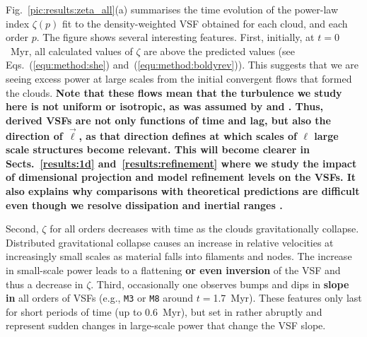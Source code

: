 Fig.~\ref{pic:results:zeta_all}(a) summarises the time evolution of the power-law index $\zeta(p)$ fit to the density-weighted VSF obtained for each cloud, and each order $p$.
The figure shows several interesting features.
First, initially, at $t=0$~Myr, all calculated values of $\zeta$ are above the predicted values (see Eqs.~(\ref{equ:method:she}) and~(\ref{equ:method:boldyrev})).
This suggests that we are seeing excess power at large scales from the initial convergent flows that formed the clouds.
\textbf{
Note that these flows mean that the turbulence we study here is not uniform or isotropic, as was assumed by \citet{She1994} and \citet{Boldyrev2002}.  Thus, derived VSFs are not only functions of time and lag, but also the direction of $\vec{\ell}$, as that direction defines at which scales of $\ell$ large scale structures become relevant.
This will become clearer in Sects.~\ref{results:1d} and~\ref{results:refinement} where we study the impact of dimensional projection and model refinement levels on the VSFs. 
It also explains why comparisons with theoretical predictions are difficult even though we resolve dissipation and inertial ranges .
}

Second, $\zeta$ for all orders decreases with time as the clouds gravitationally collapse.
Distributed gravitational collapse causes an increase in relative velocities at increasingly small scales as material falls into filaments and nodes.  The increase in small-scale power leads to a flattening \textbf{or even inversion} of the VSF and thus a decrease in $\zeta$.
Third, occasionally one observes bumps and dips in \textbf{slope in} all orders of VSFs (e.g., \texttt{M3} or \texttt{M8} around $t=$1.7~Myr). 
These features only last for short periods of time (up to 0.6~Myr), but set in rather abruptly and represent sudden changes in large-scale power that change the VSF slope. 

